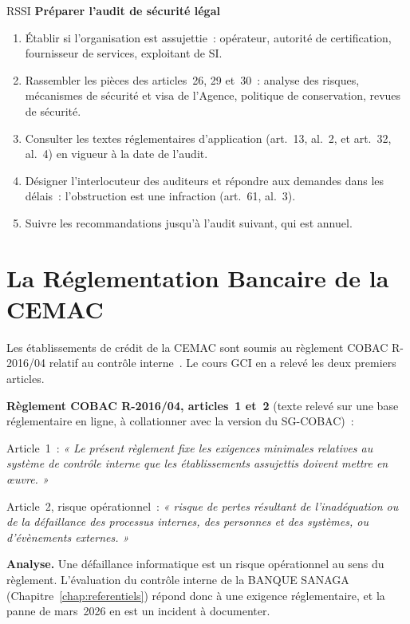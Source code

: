 \begin{boxmetier}{RSSI}
\textbf{Préparer l'audit de sécurité légal}
\begin{enumerate}
    \item Établir si l'organisation est assujettie~: opérateur, autorité de
          certification, fournisseur de services, exploitant de SI.
    \item Rassembler les pièces des articles~26, 29 et~30~: analyse des
          risques, mécanismes de sécurité et visa de l'Agence, politique de
          conservation, revues de sécurité.
    \item Consulter les textes réglementaires d'application (art.~13,
          al.~2, et art.~32, al.~4) en vigueur à la date de l'audit.
    \item Désigner l'interlocuteur des auditeurs et répondre aux demandes
          dans les délais~: l'obstruction est une infraction (art.~61,
          al.~3).
    \item Suivre les recommandations jusqu'à l'audit suivant, qui est
          annuel.
\end{enumerate}
\end{boxmetier}

\section{La Réglementation Bancaire de la CEMAC}
\label{sec:c12-cobac}

Les établissements de crédit de la CEMAC sont soumis au règlement COBAC
R-2016/04 relatif au contrôle interne~\cite{cobac2016r04}. Le cours GCI en a
relevé les deux premiers articles.

\begin{boxjuris}
\textbf{Règlement COBAC R-2016/04, articles~1 et~2} (texte relevé sur une
base réglementaire en ligne, à collationner avec la version du
SG-COBAC)~:

\medskip
Article~1~: \textit{« Le présent règlement fixe les exigences minimales
relatives au système de contrôle interne que les établissements assujettis
doivent mettre en œuvre. »}

\medskip
Article~2, risque opérationnel~: \textit{« risque de pertes résultant de
l'inadéquation ou de la défaillance des processus internes, des personnes
et des systèmes, ou d'évènements externes. »}

\medskip
\textbf{Analyse.} Une défaillance informatique est un risque opérationnel
au sens du règlement. L'évaluation du contrôle interne de la BANQUE SANAGA
(Chapitre~\ref{chap:referentiels}) répond donc à une exigence
réglementaire, et la panne de mars~2026 en est un incident à documenter.
\end{boxjuris}


